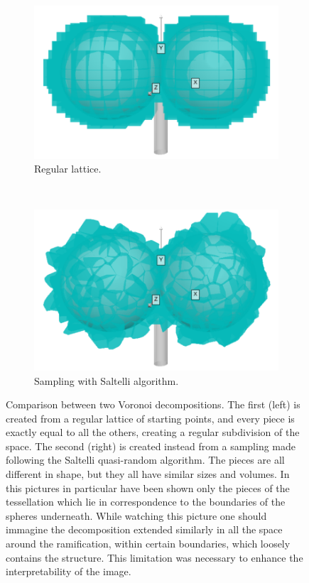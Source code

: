     \begin{figure}
        \centering
        \begin{subfigure}[b]{0.5\textwidth}
             \centering
             \includegraphics[width = \textwidth]{images/reg_vor}
             \caption{Regular lattice.}
             \label{fig:reg_vor}
        \end{subfigure}
        \\
        \begin{subfigure}[b]{0.5\textwidth}
             \centering
             \includegraphics[width = \textwidth]{images/sal_vor}
             \caption{Sampling with Saltelli algorithm.}
             \label{fig:sal_vor}
        \end{subfigure}
        \caption{Comparison between two Voronoi decompositions. The first (left) is created from a regular lattice of starting points, and every piece is exactly equal to all the others, creating a regular subdivision of the space. The second (right) is created instead from a sampling made following the Saltelli quasi-random algorithm. The pieces are all different in shape, but they all have similar sizes and volumes. In this pictures in particular have been shown only the pieces of the tessellation which lie in correspondence to the boundaries of the spheres underneath. While watching this picture one should immagine the decomposition extended similarly in all the space around the ramification, within certain boundaries, which loosely contains the structure. This limitation was necessary to enhance the interpretability of the image. }
        \label{fig:vor_comp}
    \end{figure}

